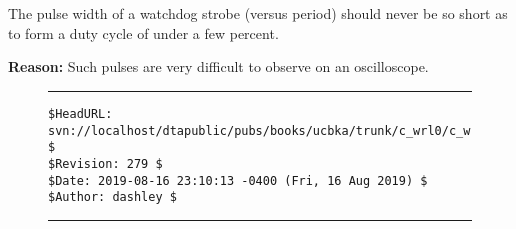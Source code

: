 
\chapter{\cwrlzerolongtitle{}}

\label{cwrl0}

\begin{vworklessonslearnedstatement} 
The pulse width of a watchdog strobe (versus period)
should never be so short as to form a duty cycle of under a few percent.
\end{vworklessonslearnedstatement} 

\noindent\textbf{Reason:} Such pulses are very difficult to observe on an 
oscilloscope.



\noindent\begin{figure}[!b]
\noindent\rule[-0.25in]{\textwidth}{1pt}
\begin{tiny}
\begin{verbatim}
$HeadURL: svn://localhost/dtapublic/pubs/books/ucbka/trunk/c_wrl0/c_wrl0.tex $
$Revision: 279 $
$Date: 2019-08-16 23:10:13 -0400 (Fri, 16 Aug 2019) $
$Author: dashley $
\end{verbatim}
\end{tiny}
\noindent\rule[0.25in]{\textwidth}{1pt}
\end{figure}

% 
